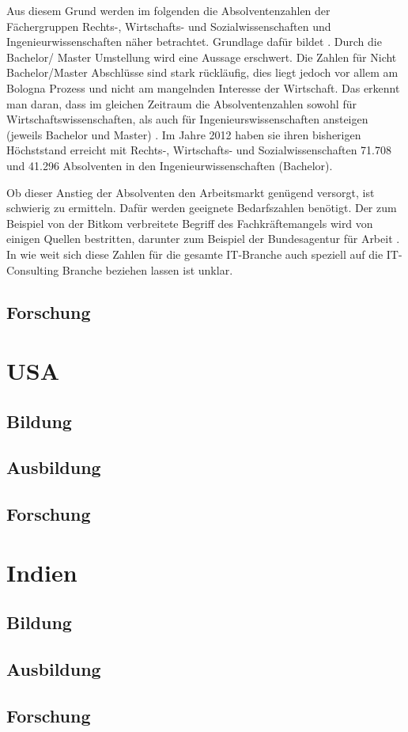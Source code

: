 Aus diesem Grund werden im folgenden die Absolventenzahlen der Fächergruppen Rechts-, Wirtschafts- und Sozialwissenschaften und Ingenieurwissenschaften näher betrachtet.
Grundlage dafür bildet \cite{absolventen} . Durch die Bachelor/ Master Umstellung wird eine Aussage erschwert. Die Zahlen für Nicht Bachelor/Master Abschlüsse sind stark rückläufig, dies liegt jedoch vor allem am Bologna Prozess und nicht am mangelnden Interesse der Wirtschaft. Das erkennt man daran, dass im gleichen Zeitraum die Absolventenzahlen sowohl für Wirtschaftswissenschaften, als auch für Ingenieurswissenschaften ansteigen (jeweils Bachelor und Master) . Im Jahre 2012 haben sie ihren bisherigen Höchststand erreicht mit Rechts-, Wirtschafts- und Sozialwissenschaften 71.708 und 41.296 Absolventen in den Ingenieurwissenschaften (Bachelor).

Ob dieser Anstieg der Absolventen den Arbeitsmarkt genügend versorgt, ist schwierig zu ermitteln. Dafür werden geeignete Bedarfszahlen benötigt. Der zum Beispiel von der Bitkom verbreitete Begriff \cite{fachkraft} des Fachkräftemangels wird von einigen Quellen bestritten, darunter zum Beispiel der Bundesagentur für Arbeit \cite{fachkraftnein}. In wie weit sich diese Zahlen für die gesamte IT-Branche auch speziell auf die IT-Consulting Branche beziehen lassen ist unklar.

\subsection{Forschung}

\section{USA}
\subsection{Bildung}
\subsection{Ausbildung}
\subsection{Forschung}

\section{Indien}
\subsection{Bildung}
\subsection{Ausbildung}
\subsection{Forschung}







